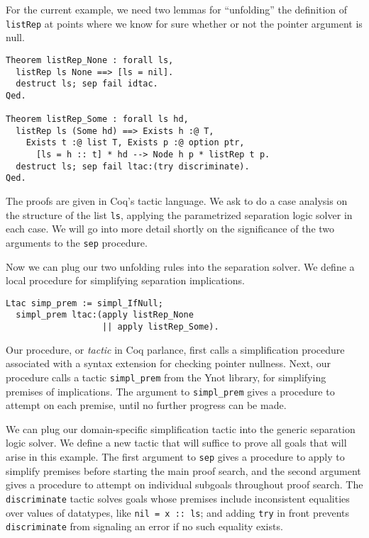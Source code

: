 \documentclass[preprint,nocopyrightspace]{sigplanconf}
\newcommand{\cd}[1]{\texttt{#1}}
\begin{document}
For the current example, we need two lemmas for ``unfolding'' the definition of \cd{listRep} at points where we know for sure whether or not the pointer argument is null.

\begin{verbatim}
Theorem listRep_None : forall ls,
  listRep ls None ==> [ls = nil].
  destruct ls; sep fail idtac.
Qed.

Theorem listRep_Some : forall ls hd,
  listRep ls (Some hd) ==> Exists h :@ T,
    Exists t :@ list T, Exists p :@ option ptr,
      [ls = h :: t] * hd --> Node h p * listRep t p.
  destruct ls; sep fail ltac:(try discriminate).
Qed.
\end{verbatim}

The proofs are given in Coq's tactic language.  We ask to do a case analysis on the structure of the list \cd{ls}, applying the parametrized separation logic solver in each case.  We will go into more detail shortly on the significance of the two arguments to the \cd{sep} procedure.

Now we can plug our two unfolding rules into the separation solver.  We define a local procedure for simplifying separation implications.

\begin{verbatim}
Ltac simp_prem := simpl_IfNull;
  simpl_prem ltac:(apply listRep_None
                   || apply listRep_Some).
\end{verbatim}

Our procedure, or \emph{tactic} in Coq parlance, first calls a simplification procedure associated with a syntax extension for checking pointer nullness.  Next, our procedure calls a tactic \cd{simpl\_prem} from the Ynot library, for simplifying premises of implications.  The argument to \cd{simpl\_prem} gives a procedure to attempt on each premise, until no further progress can be made.

We can plug our domain-specific simplification tactic into the generic separation logic solver.  We define a new tactic that will suffice to prove all goals that will arise in this example.  The first argument to \cd{sep} gives a procedure to apply to simplify premises before starting the main proof search, and the second argument gives a procedure to attempt on individual subgoals throughout proof search.  The \cd{discriminate} tactic solves goals whose premises include inconsistent equalities over values of datatypes, like \cd{nil = x :: ls}; and adding \cd{try} in front prevents \cd{discriminate} from signaling an error if no such equality exists.
\end{document}
